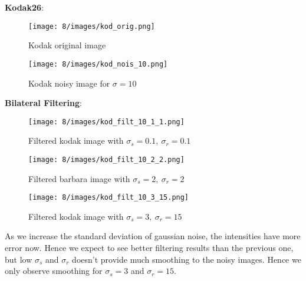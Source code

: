 \documentclass[12pt]{article}
\begin{document}
\begin{itemize}
    \textbf{Kodak26}:
    
    \begin{figure}[H]
        \centering
        \begin{minipage}{.45\textwidth}
          \centering
          \texttt{[image: 8/images/kod\_orig.png]}
          \caption*{Kodak original image}
          \label{fig:totalpowervst}
        \end{minipage}
        \begin{minipage}{.45\textwidth}
          \centering
          \texttt{[image: 8/images/kod\_nois\_10.png]}
          \caption*{Kodak noisy image for $\sigma = 10$}
          \label{fig:totalpower2}
        \end{minipage}
        \label{fig:totalPower}
    \end{figure}
    \newpage
    \textbf{Bilateral Filtering}:
    
    \begin{figure}[H]
        \centering
        \begin{minipage}{.45\textwidth}
          \centering
          \texttt{[image: 8/images/kod\_filt\_10\_1\_1.png]}
          \caption*{Filtered kodak image with $\sigma_s=0.1, \ \sigma_r=0.1$}
          \label{fig:totalpowervst}
        \end{minipage}
        \begin{minipage}{.45\textwidth}
          \centering
          \texttt{[image: 8/images/kod\_filt\_10\_2\_2.png]}
          \caption*{Filtered barbara image with $\sigma_s=2, \ \sigma_r=2$}
          \label{fig:totalpower2}
        \end{minipage}
        \label{fig:totalPower}
    \end{figure}
    
    \begin{figure}[H]
        \centering
        \begin{minipage}{.45\textwidth}
          \centering
          \texttt{[image: 8/images/kod\_filt\_10\_3\_15.png]}
          \caption*{Filtered kodak image with $\sigma_s=3, \ \sigma_r=15$}
          \label{fig:totalpowervst}
        \end{minipage}
    \end{figure}
    As we increase the standard deviation of gaussian noise, the intensities have more error now. Hence we expect to see better filtering results than the previous one, but low $\sigma_s$ and $\sigma_r$ doesn't provide much smoothing to the noisy images. Hence we only observe smoothing for $\sigma_s=3$ and $\sigma_r=15$.
    
\end{itemize}
\end{document}
